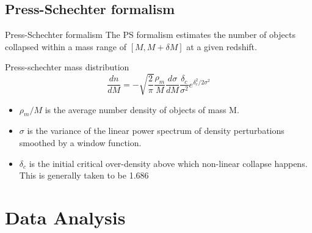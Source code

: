 \documentclass{beamer}
\begin{document}
\subsection{Press-Schechter formalism}
\begin{frame}{Press-Schechter formalism}
	The PS formalism estimates the number of objects collapsed within a mass range of $[M,M+\delta M]$ at a given redshift.
	\begin{block}{Press-schechter mass distribution}
		\begin{equation}
		\frac{dn}{dM}=-\sqrt{\frac{2}{\pi}}\frac{\rho_m}{M}\frac{d\sigma}{dM}\frac{\delta_c}{\sigma^2}e^{\delta_c^2/2\sigma^2}
		\end{equation}
	\end{block}
	\begin{itemize}
		\item $\rho_m/M$ is the average number density of objects of mass M.
		\item $\sigma$ is the variance of the linear power spectrum of density perturbations smoothed by a window function.
		\item $\delta_c$ is the initial critical over-density above which non-linear collapse happens. This is generally taken to be 1.686 
	\end{itemize}
\end{frame}
\section{Data Analysis}
\end{document}
